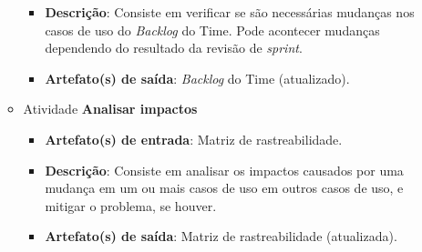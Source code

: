 \begin{itemize}
\begin{itemize}
\begin{itemize}
	      \item \textbf{Descrição}: Consiste em verificar se são necessárias mudanças nos casos de uso do \textit{Backlog}
		do Time. Pode acontecer mudanças dependendo do resultado da revisão de \textit{sprint}.
	      
	      \item \textbf{Artefato(s) de saída}: \textit{Backlog} do Time (atualizado).
		    
	    \end{itemize}
	    
	 \item Atividade \textbf{Analisar impactos}
	    
	    \begin{itemize}
	      \item \textbf{Artefato(s) de entrada}: Matriz de rastreabilidade.

	      \item \textbf{Descrição}: Consiste em analisar os impactos causados por uma mudança em um ou mais casos de uso
	       em outros casos de uso, e mitigar o problema, se houver.
	      
	      \item \textbf{Artefato(s) de saída}: Matriz de rastreabilidade (atualizada).
		    
	    \end{itemize}
	    
	\end{itemize}
	     
    \end{itemize}
    
    \vfill